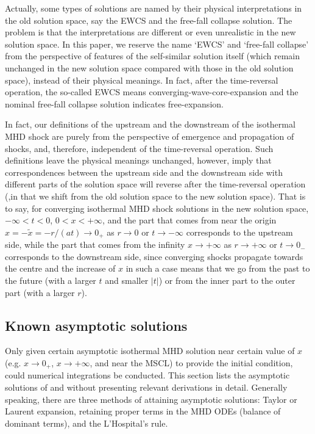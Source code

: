 \documentclass[fleqn,usenatbib]{mnras}
\begin{document}
Actually, some types of solutions are named by their physical interpretations in the old solution space, say the EWCS and the free-fall collapse solution. The problem is that the interpretations are different or even unrealistic in the new solution space. In this paper, we reserve the name `EWCS' and `free-fall collapse' from the perspective of features of the self-similar solution itself (which remain unchanged in the new solution space compared with those in the old solution space), instead of their physical meanings. In fact, after the time-reversal operation, the so-called EWCS means converging-wave-core-expansion and the nominal free-fall collapse solution indicates free-expansion.

In fact, our definitions of the upstream and the downstream of the isothermal MHD shock are purely from the perspective of emergence and propagation of shocks, and, therefore, independent of the time-reversal operation. Such definitions leave the physical meanings unchanged, however, imply that correspondences between the upstream side and the downstream side with different parts of the solution space will reverse after the time-reversal operation (,in that we shift from the old solution space to the new solution space). That is to say, for converging isothermal MHD shock solutions in the new solution space, $-\infty<t<0$, $0<x<+\infty$, and the part that comes from near the origin $x=-\widetilde{x}=-r/(at)\rightarrow 0_{+}$ as $r\rightarrow 0$ or $t\rightarrow -\infty$ corresponds to the upstream side, while the part that comes from the infinity $x\rightarrow +\infty$ as $r\rightarrow +\infty$ or $t\rightarrow 0_{-}$ corresponds to the downstream side, since converging shocks propagate towards the centre and the increase of $x$ in such a case means that we go from the past to the future (with a larger $t$ and smaller $|t|$) or from the inner part to the outer part (with a larger $r$).


\subsection{Known asymptotic solutions}
Only given certain asymptotic isothermal MHD solution near certain value of $x$ (e.g. $x\rightarrow 0_{+}$, $x\rightarrow +\infty$, and near the MSCL) to provide the initial condition, could numerical integrations be conducted. This section lists the asymptotic solutions of \citet{yuLou2005} and \citet{yuLou2006} without presenting relevant derivations in detail. Generally speaking, there are three methods of attaining asymptotic solutions: Taylor or Laurent expansion, retaining proper terms in the MHD ODEs (balance of dominant terms), and the L'Hospital's rule.
\end{document}
